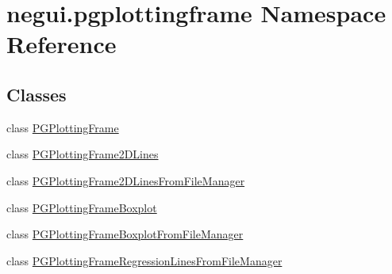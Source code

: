 \hypertarget{namespacenegui_1_1pgplottingframe}{}\section{negui.\+pgplottingframe Namespace Reference}
\label{namespacenegui_1_1pgplottingframe}
\subsection*{Classes}
\begin{DoxyCompactItemize}
\item 
class \hyperlink{classnegui_1_1pgplottingframe_1_1PGPlottingFrame}{P\+G\+Plotting\+Frame}
\item 
class \hyperlink{classnegui_1_1pgplottingframe_1_1PGPlottingFrame2DLines}{P\+G\+Plotting\+Frame2\+D\+Lines}
\item 
class \hyperlink{classnegui_1_1pgplottingframe_1_1PGPlottingFrame2DLinesFromFileManager}{P\+G\+Plotting\+Frame2\+D\+Lines\+From\+File\+Manager}
\item 
class \hyperlink{classnegui_1_1pgplottingframe_1_1PGPlottingFrameBoxplot}{P\+G\+Plotting\+Frame\+Boxplot}
\item 
class \hyperlink{classnegui_1_1pgplottingframe_1_1PGPlottingFrameBoxplotFromFileManager}{P\+G\+Plotting\+Frame\+Boxplot\+From\+File\+Manager}
\item 
class \hyperlink{classnegui_1_1pgplottingframe_1_1PGPlottingFrameRegressionLinesFromFileManager}{P\+G\+Plotting\+Frame\+Regression\+Lines\+From\+File\+Manager}
\end{DoxyCompactItemize}
